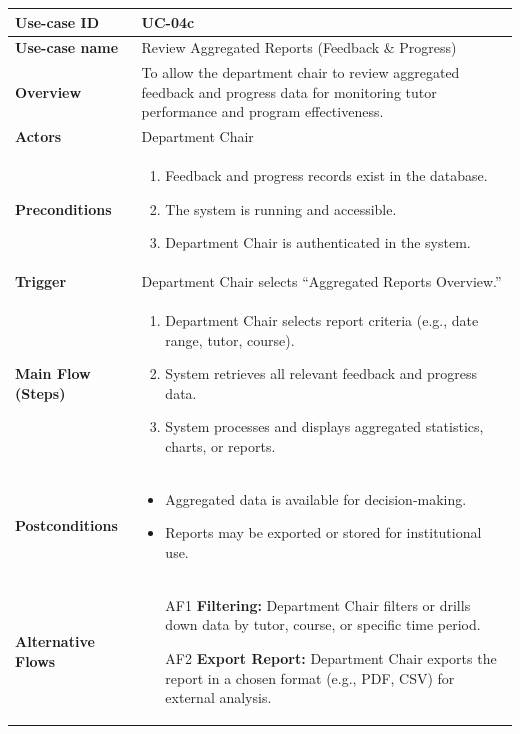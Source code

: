 \begin{table}[H]
\centering
\renewcommand{\arraystretch}{1.3}
\begin{tabular}{|p{3cm}|p{11cm}|}
\hline
\textbf{Use-case ID} & UC-04c \\ 
\hline
\textbf{Use-case name} & Review Aggregated Reports (Feedback \& Progress) \\ 
\hline
\textbf{Overview} & To allow the department chair to review aggregated feedback and progress data for monitoring tutor performance and program effectiveness. \\ 
\hline
\textbf{Actors} & Department Chair \\ 
\hline
\textbf{Preconditions} & 
\begin{enumerate}
    \item Feedback and progress records exist in the database.
    \item The system is running and accessible.
    \item Department Chair is authenticated in the system.
\end{enumerate} \\ 
\hline
\textbf{Trigger} & Department Chair selects ``Aggregated Reports Overview.'' \\ 
\hline
\textbf{Main Flow (Steps)} & 
\begin{enumerate}
    \item Department Chair selects report criteria (e.g., date range, tutor, course).
    \item System retrieves all relevant feedback and progress data.
    \item System processes and displays aggregated statistics, charts, or reports.
\end{enumerate} \\ 
\hline
\textbf{Postconditions} & 
\begin{itemize}
    \item Aggregated data is available for decision-making.
    \item Reports may be exported or stored for institutional use.
\end{itemize} \\ 
\hline
\textbf{Alternative Flows} & 
\begin{itemize}
    \item[AF1] \textbf{Filtering:} Department Chair filters or drills down data by tutor, course, or specific time period.
    \item[AF2] \textbf{Export Report:} Department Chair exports the report in a chosen format (e.g., PDF, CSV) for external analysis.

\end{itemize}
\end{tabular}
\end{table}
